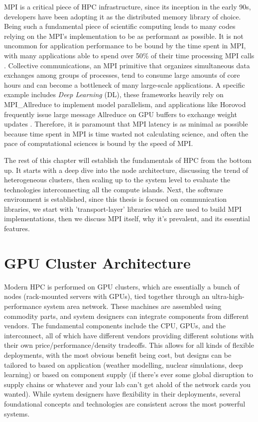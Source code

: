 MPI is a critical piece of HPC infrastructure, since its inception in the early 90s, developers have been adopting it as the distributed memory library of choice.
Being such a fundamental piece of scientific computing leads to many codes relying on the MPI's implementation to be as performant as possible.  
It is not uncommon for application performance to be bound by the time spent in MPI, with many applications able to spend over 50\% of their time processing MPI calls \cite{Chunduri2018CharacterizeMPIonProd}.
Collective communications, an MPI primitive that organizes simultaneous data exchanges among groups of processes, tend to consume large amounts of core hours and can become a bottleneck of many large-scale applications.
A specific example includes \textit{Deep Learning} (DL), these frameworks heavily rely on MPI\_Allreduce to implement model parallelism, and applications like Horovod frequently issue large message Allreduce on GPU buffers to exchange weight updates \cite{Awan2019CommProfDLonClusters, Jain2019PerfCharDNNTFPT, Alizadeh2022PAPCollDL}.
Therefore, it is paramount that MPI latency is as minimal as possible because time spent in MPI is time wasted not calculating science, and often the pace of computational sciences is bound by the speed of MPI.

The rest of this chapter will establish the fundamentals of HPC from the bottom up.
It starts with a deep dive into the node architecture, discussing the trend of heterogeneous clusters, then scaling up to the system level to evaluate the technologies interconnecting all the compute islands.
Next, the software environment is established, since this thesis is focused on communication libraries, we start with 'transport-layer' libraries which are used to build MPI implementations, then we discuss MPI itself, why it's prevalent, and its essential features. 

\section{GPU Cluster Architecture}
Modern HPC is performed on GPU clusters, which are essentially a bunch of nodes (rack-mounted servers with GPUs), tied together through an ultra-high-performance system area network.
These machines are assembled using commodity parts, and system designers can integrate components from different vendors.
The fundamental components include the CPU, GPUs, and the interconnect, all of which have different vendors providing different solutions with their own price/performance/density tradeoffs.
This allows for all kinds of flexible deployments, with the most obvious benefit being cost, but designs can be tailored to based on application (weather modelling, nuclear simulations, deep learning) or based on component supply (if there's ever some global disruption to supply chains or whatever and your lab can't get ahold of the network cards you wanted).
While system designers have flexibility in their deployments, several foundational concepts and technologies are consistent across the most powerful systems.

